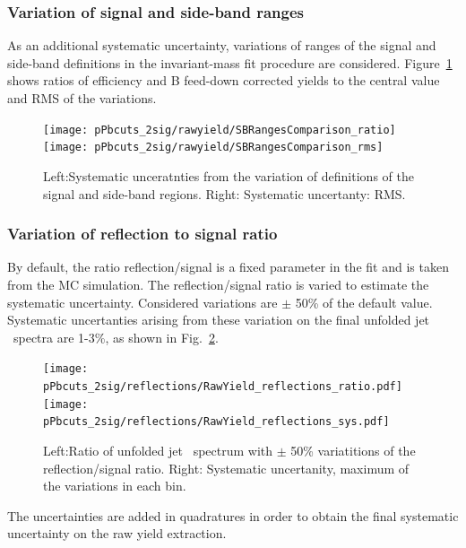 \subsubsection{Variation of signal and side-band ranges}

As an additional systematic uncertainty, variations of ranges of the signal and side-band definitions in the invariant-mass fit procedure are considered.
Figure~\ref{fig:JetPtSys_Dzero_SBvariaton} shows ratios of efficiency and B feed-down corrected yields to the central value and RMS of the variations.

\begin{figure}[bth]
\begin{center}
\texttt{[image: pPbcuts\_2sig/rawyield/SBRangesComparison\_ratio]}
\texttt{[image: pPbcuts\_2sig/rawyield/SBRangesComparison\_rms]}
\caption{Left:Systematic unceratnties from the variation of definitions of the signal and side-band regions. Right: Systematic uncertanty: RMS.} 
\label{fig:JetPtSys_Dzero_SBvariaton}
\end{center}
\end{figure}


\subsubsection{Variation of reflection to signal ratio}

By default, the ratio reflection/signal is a fixed parameter in the fit and is taken from the MC simulation. The reflection/signal ratio is varied to estimate the
systematic uncertainty. Considered variations are $\pm$ 50\% of the default value. Systematic uncertanties arising from these variation on the final unfolded jet \pt\ spectra are 1-3\%, as shown in Fig.~\ref{fig:JetPtSys_Dzero_Refl}.

\begin{figure}[bth]
\begin{center}
\texttt{[image: pPbcuts\_2sig/reflections/RawYield\_reflections\_ratio.pdf]}
\texttt{[image: pPbcuts\_2sig/reflections/RawYield\_reflections\_sys.pdf]}
\caption{Left:Ratio of unfolded jet \pt\ spectrum with $\pm$ 50\% variatitions of the reflection/signal ratio. Right: Systematic uncertanity, maximum of the variations in each bin.} 
\label{fig:JetPtSys_Dzero_Refl}
\end{center}
\end{figure}


The uncertainties are added in quadratures in order to obtain the final systematic uncertainty on the raw yield extraction. 


